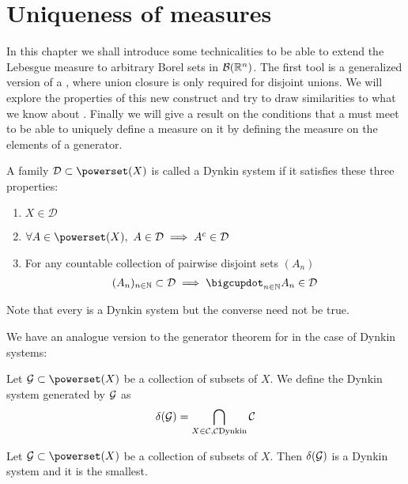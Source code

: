 
\chapter{Uniqueness of measures}

In this chapter we shall introduce some technicalities to be able to extend the Lebesgue measure to arbitrary Borel sets in $\mathcal{B}(\mathbb{R}^n)$. The first tool is a generalized version of a \siga, where union closure is only required for disjoint unions. We will explore the properties of this new construct and try to draw similarities to what we know about \sigas. Finally we will give a result on the conditions that a \siga must meet to be able to uniquely define a measure on it by defining the measure on the elements of a generator.

\newcommand{\calD}{\mathcal{D}}
\begin{dfn}
	A family $\calD \subset \powerset(X)$ is called a Dynkin system if it satisfies these three properties:
	\begin{enumerate}
		\item $X \in \calD$
		\item $\forall A \in \powerset(X),\ A \in \calD \implies A^\complement \in \calD$
		\item For any countable collection of pairwise disjoint sets $(A_n)$
		\begin{align*}
			(A_n)_{n\in\N} \subset \calD \implies \bigcupdot_{n \in \N} A_n \in \calD
		\end{align*}
	\end{enumerate}
\end{dfn}

Note that every \siga is a Dynkin system but the converse need not be true.

We have an analogue version to the generator theorem for \sigas in the case of Dynkin systems:

\begin{dfn}
	Let $\calG \subset \powerset(X)$ be a collection of subsets of $X$. We define the Dynkin system generated by $\mathcal{G}$ as
	\begin{align*}
		\delta(\mathcal{G}) = \bigcap_{X \in \mathcal{C}, \mathcal{C} \text{Dynkin}} \mathcal{C}
	\end{align*}
\end{dfn}

\begin{thm}
	Let $\calG \subset \powerset(X)$ be a collection of subsets of $X$. Then $\delta(\mathcal{G})$ is a Dynkin system and it is the smallest.
\end{thm}

